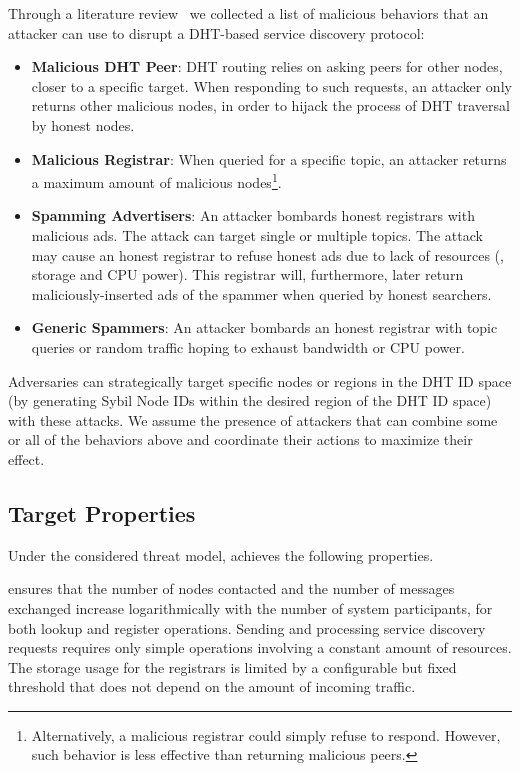 Through a literature review~\cite{chen2020survey, henningsen2019eclipsing} we collected a list of malicious behaviors that an attacker can use to disrupt a DHT-based service discovery protocol:
\begin{itemize}
    \item \textbf{Malicious DHT Peer}: DHT routing relies on asking peers for other nodes, closer to a specific target. When responding to such requests, an attacker only returns other malicious nodes, in order to hijack the process of DHT traversal by honest nodes. 
    \item \textbf{Malicious Registrar}: When queried for a specific topic, an attacker returns a maximum amount of malicious nodes\footnote{Alternatively, a malicious registrar could simply refuse to respond. However, such behavior is less effective than returning malicious peers.}. 
    \item \textbf{Spamming Advertisers}: An attacker bombards honest registrars with malicious ads. The attack can target single or multiple topics. The attack may cause an honest registrar to refuse honest ads due to lack of resources (\eg, storage and CPU power). This registrar will, furthermore, later return maliciously-inserted ads of the spammer when queried by honest searchers. 
    \item \textbf{Generic Spammers}: An attacker bombards an honest registrar with topic queries or random traffic hoping to exhaust bandwidth or CPU power.
\end{itemize}

Adversaries can strategically target specific nodes or regions in the DHT ID space (\ie by generating Sybil Node IDs within the desired region of the DHT ID space) with these attacks.
We assume the presence of attackers that can combine some or all of the behaviors above and coordinate their actions to maximize their effect. 

\subsection{Target Properties}

Under the considered threat model, \sysname achieves the following properties.

\sysname ensures that the number of nodes contacted and the number of messages exchanged increase logarithmically with the number of system participants, for both lookup and register operations. 
Sending and processing service discovery requests requires only simple operations involving a constant amount of resources.
The storage usage for the registrars is limited by a configurable but fixed threshold that does not depend on the amount of incoming traffic. 

